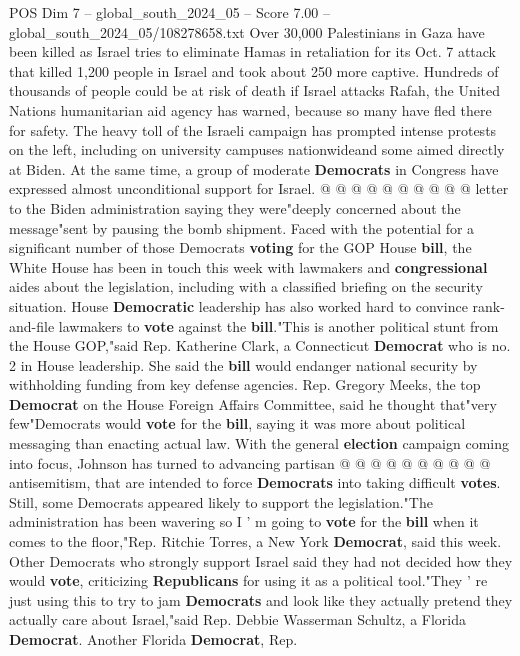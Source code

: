 \begin{textsample}{POS Dim 7 – global\_south\_2024\_05 – Score 7.00 – global\_south\_2024\_05/108278658.txt}
Over 30,000 Palestinians in Gaza have been killed as Israel tries to eliminate Hamas in retaliation for its Oct. 7 attack that killed 1,200 people in Israel and took about 250 more captive.
Hundreds of thousands of people could be at risk of death if Israel attacks Rafah, the United Nations humanitarian aid agency has warned, because so many have fled there for safety.
The heavy toll of the Israeli campaign has prompted intense protests on the left, including on university campuses nationwideand some aimed directly at Biden.
At the same time, a group of moderate \textbf{Democrats} in Congress have expressed almost unconditional support for Israel. @ @ @ @ @ @ @ @ @ @ letter to the Biden administration saying they were"deeply concerned about the message"sent by pausing the bomb shipment.
Faced with the potential for a significant number of those Democrats \textbf{voting} for the GOP House \textbf{bill}, the White House has been in touch this week with lawmakers and \textbf{congressional} aides about the legislation, including with a classified briefing on the security situation.
House \textbf{Democratic} leadership has also worked hard to convince rank-and-file lawmakers to \textbf{vote} against the \textbf{bill}."This is another political stunt from the House GOP,"said Rep.
Katherine Clark, a Connecticut \textbf{Democrat} who is no. 2 in House leadership.
She said the \textbf{bill} would endanger national security by withholding funding from key defense agencies.
Rep.
Gregory Meeks, the top \textbf{Democrat} on the House Foreign Affairs Committee, said he thought that"very few"Democrats would \textbf{vote} for the \textbf{bill}, saying it was more about political messaging than enacting actual law.
With the general \textbf{election} campaign coming into focus, Johnson has turned to advancing partisan @ @ @ @ @ @ @ @ @ @ antisemitism, that are intended to force \textbf{Democrats} into taking difficult \textbf{votes}.
Still, some Democrats appeared likely to support the legislation."The administration has been wavering so I ' m going to \textbf{vote} for the \textbf{bill} when it comes to the floor,"Rep.
Ritchie Torres, a New York \textbf{Democrat}, said this week.
Other Democrats who strongly support Israel said they had not decided how they would \textbf{vote}, criticizing \textbf{Republicans} for using it as a political tool."They ' re just using this to try to jam \textbf{Democrats} and look like they actually pretend they actually care about Israel,"said Rep.
Debbie Wasserman Schultz, a Florida \textbf{Democrat}.
Another Florida \textbf{Democrat}, Rep.

\end{textsample}
